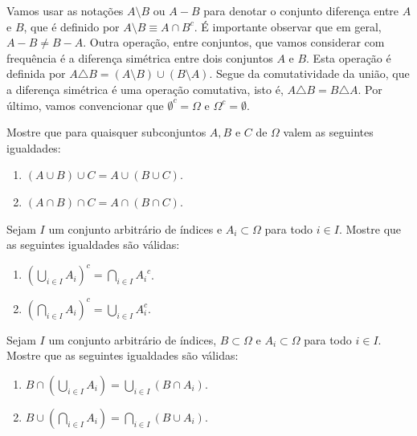 Vamos usar as notações $A \setminus B$ ou $A-B$
para denotar o conjunto diferença entre $A$ e $B$,
que é definido por $A\setminus B\equiv  A \cap B^c$.
É importante observar que em geral, 
$A - B \neq B - A$.
Outra operação, entre conjuntos, que vamos 
considerar com frequência é 
a diferença simétrica entre dois conjuntos $A$ e $B$. 
Esta operação é definida por 
$A\triangle B = (A \setminus B) \cup (B\setminus A).$
Segue da comutatividade da união, 
que a diferença simétrica é uma operação comutativa,
isto é,  $A\triangle B = B\triangle A$.
Por último, vamos convencionar que 
$\emptyset^c = \Omega$ e $\Omega^c = \emptyset$.




\begin{exercicio}[Associatividade] 
Mostre que para quaisquer subconjuntos $A,B$ e $C$ 
de $\Omega$ valem as seguintes igualdades:
\begin{enumerate}
	\item $(A\cup B)\cup C= A \cup ( B \cup C)$.
	\item $(A\cap B)\cap C= A \cap ( B \cap C)$.
\end{enumerate}
\end{exercicio}






\begin{exercicio} 
Sejam $I$ um conjunto arbitrário de índices
e $A_i\subset \Omega$ para todo $i\in I$. Mostre que
as seguintes igualdades são válidas:
\begin{enumerate}
\item 
$
\left( \displaystyle\bigcup_{i \in I}{A_i} \right)^c 
= 
\displaystyle\bigcap_{i \in I}{{A_i}^c}
$.

\item
$
\left( \displaystyle\bigcap_{i \in I}{A_i} \right)^c 
= 
\displaystyle\bigcup_{i \in I}{A_i^c}
$.
%
\end{enumerate}
\end{exercicio}





\begin{exercicio}[Distributiva] 
Sejam $I$ um conjunto arbitrário de índices, 
$B\subset \Omega$ e $A_i\subset \Omega$ para todo $i\in I$. 
Mostre que as seguintes igualdades são válidas:
%
\begin{enumerate}
\item 
$
B \cap \left( \displaystyle\bigcup_{i \in I}{A_i} \right) 
= 
\displaystyle\bigcup_{i \in I}{(B\cap A_i)} 
$.
%
\item
$
B \cup \left( \displaystyle\bigcap_{i \in I}{A_i} \right) 
= 
\displaystyle\bigcap_{i \in I}{(B\cup A_i)} 
$.
\end{enumerate}
%
\end{exercicio}







